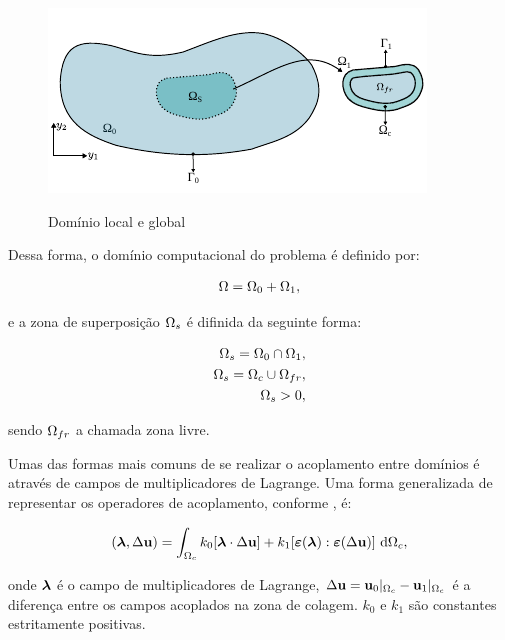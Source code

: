 \begin{figure}[!htbp]
	\caption{Domínio local e global}
	\centering 
	\includegraphics[scale=1.5,trim=0cm 0cm 0cm 0.0cm, clip=true]{Imagens/Cap6/dominioArlequin.pdf}	
	\label{fig:dominioArlequin}
\end{figure}

Dessa forma, o domínio computacional do problema é definido por:

\begin{align}
	\Omega = \Omega_0 + \Omega_1, 
\end{align}

\noindent e a zona de superposição $\Omega_s$ é difinida da seguinte forma:

\begin{align}
	\Omega_s = \Omega_0 \cap \Omega_1, \\
	\Omega_s = \Omega_c \cup \Omega_{fr}, \\
	\Omega_s > 0, 
\end{align}

\noindent sendo  $\Omega_{fr}$ a chamada zona livre.

Umas das formas mais comuns de se realizar o acoplamento entre domínios é através de campos de multiplicadores de Lagrange. Uma forma generalizada de representar os operadores de acoplamento, conforme , é:

\begin{align}
	(\boldsymbol{\lambda},\Delta \mathbf{u}) =  \int_{\Omega_c} k_{0}[\boldsymbol{\lambda} \cdot \Delta \mathbf{u} ] + k_{1}[\bm{\varepsilon} (\boldsymbol{\lambda}) : \bm{\varepsilon} (\Delta \mathbf{u})] \ \mathrm{d} \Omega_c,
\end{align}

\noindent onde $\boldsymbol{\lambda}$ é o campo de multiplicadores de Lagrange, $\Delta \mathbf{u} = \mathbf{u}_0 |_{\Omega_c} - \mathbf{u}_1 |_{\Omega_c}$ é a diferença entre os campos acoplados na zona de colagem. $k_{0}$ e $k_{1}$ são constantes estritamente positivas. 

